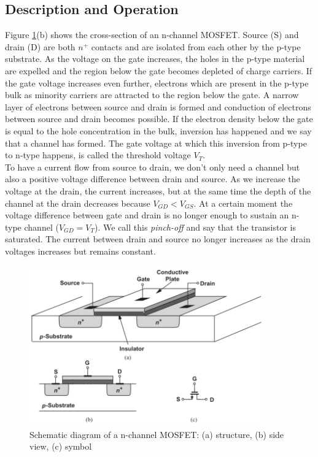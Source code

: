 \subsection{Description and Operation}
Figure \ref{fig:mosfet1}(b) shows the cross-section of an n-channel MOSFET. Source (S) and drain (D) are both $n^+$ contacts and are isolated from each other by the p-type substrate. As the voltage on the gate increases, the holes in the p-type material are expelled and the region below the gate becomes depleted of charge carriers. If the gate voltage increases even further, electrons which are present in the p-type bulk as minority carriers are attracted to the region below the gate. A narrow layer of electrons between source and drain is formed and conduction of electrons between source and drain becomes possible. If the electron density below the gate is equal to the hole concentration in the bulk, inversion has happened and we say that a channel has formed. The gate voltage at which this inversion from p-type to n-type happens, is called the threshold voltage $V_T$.\\
To have a current flow from source to drain, we don't only need a channel but also a positive voltage difference between drain and source. As we increase the voltage at the drain, the current increases, but at the same time the depth of the channel at the drain decreases because $V_{GD} < V_{GS}$. At a certain moment the voltage difference between gate and drain is no longer enough to sustain an n-type channel ($V_{GD} = V_T$). We call this \emph{pinch-off} and say that the transistor is saturated. The current between drain and source no longer increases as the drain voltages increases but remains constant.

\begin{figure}[h!]
\centering
\includegraphics[width=10cm]{figures/ch01/mosfet1b.jpg}
\caption{Schematic diagram of a n-channel MOSFET: (a) structure, (b) side view, (c) symbol} 
\label{fig:mosfet1}
\end{figure}

